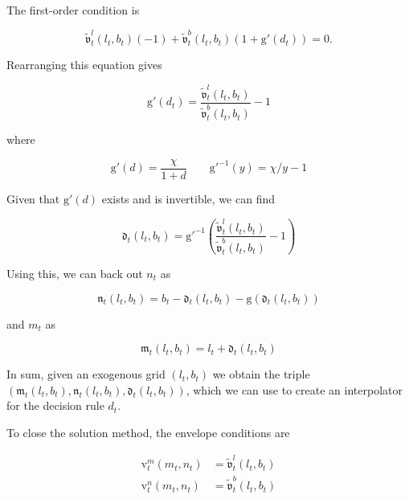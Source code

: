 \documentclass{article}
\newcommand{\bRat}{b}
\newcommand{\vFunc}{\mathrm{v}}
\newcommand{\mRat}{m}
\newcommand{\vOpt}{\tilde{\mathfrak{v}}}
\newcommand{\mEndFunc}{\mathfrak{m}}
\newcommand{\nRat}{n}
\newcommand{\dRat}{d}
\newcommand{\gFunc}{\mathrm{g}}
\newcommand{\xFer}{\chi}
\newcommand{\lRat}{l}
\newcommand{\dEndFunc}{\mathfrak{d}}
\newcommand{\nEndFunc}{\mathfrak{n}}
\begin{document}
The first-order condition is

\begin{equation}
\vOpt_{t}^{\lRat}(\lRat_{t}, \bRat_{t})(-1) +
  \vOpt_{t}^{\bRat}(\lRat_{t}, \bRat_{t})(1+\gFunc'(\dRat_{t})) = 0.
\end{equation}

Rearranging this equation gives

\begin{equation}
\gFunc'(\dRat_{t}) = \frac{\vOpt_{t}^{\lRat}(\lRat_{t},
    \bRat_{t})}{\vOpt_{t}^{\bRat}(\lRat_{t}, \bRat_{t})} - 1
\end{equation}

where

\begin{equation}
\gFunc'(\dRat) =
  \frac{\xFer}{1+\dRat} \qquad \gFunc'^{-1}(y) = \xFer/y - 1
\end{equation}

Given that $\gFunc'(\dRat)$ exists and is invertible, we can find

\begin{equation}
\dEndFunc_{t}(\lRat_{t}, \bRat_{t}) = \gFunc'^{-1}\left(
  \frac{\vOpt_{t}^{\lRat}(\lRat_{t},
    \bRat_{t})}{\vOpt_{t}^{\bRat}(\lRat_{t},
    \bRat_{t})} - 1 \right)
\end{equation}

Using this, we can back out $\nRat_{t}$ as

\begin{equation}
\nEndFunc_{t}(\lRat_{t}, \bRat_{t}) = \bRat_{t} -
  \dEndFunc_{t}(\lRat_{t}, \bRat_{t}) - \gFunc(\dEndFunc_{t}(\lRat_{t},
    \bRat_{t}))
\end{equation}

and $\mRat_{t}$ as

\begin{equation}
\mEndFunc_{t}(\lRat_{t}, \bRat_{t}) = \lRat_{t} +
  \dEndFunc_{t}(\lRat_{t}, \bRat_{t})
\end{equation}

In sum, given an exogenous grid $(\lRat_{t}, \bRat_{t})$ we obtain the triple
$\left(\mEndFunc_{t}(\lRat_{t}, \bRat_{t}), \nEndFunc_{t}(\lRat_{t},
    \bRat_{t}), \dEndFunc_{t}(\lRat_{t}, \bRat_{t})\right)$, which
we can use to
create an interpolator for the decision rule $\dRat_{t}$.

To close the solution method, the envelope conditions are

\begin{equation}
\begin{split}
    \vFunc_{t}^{\mRat}(\mRat_{t}, \nRat_{t}) & =
    \vOpt_{t}^{\lRat}(\lRat_{t}, \bRat_{t}) \\
    \vFunc_{t}^{\nRat}(\mRat_{t}, \nRat_{t}) & =
    \vOpt_{t}^{\bRat}(\lRat_{t}, \bRat_{t})
  \end{split}
\end{equation}
\end{document}
